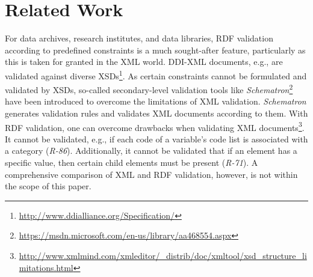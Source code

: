 \documentclass[conference]{IEEEtran}
\newcommand{\ke}[1]{\todo[size=\small, color=red!40]{\textbf{Kai:} #1}}
\newcommand{\tb}[1]{\todo[size=\small, color=green!40]{\textbf{Thomas:} #1}}
\begin{document}
 


\section{Related Work}
\label{related-work}

For data archives, research institutes, and data libraries,
RDF validation according to predefined constraints is a much sought-after feature, 
particularly as this is taken for granted in the XML world.
DDI-XML documents, e.g., are validated against diverse XSDs\footnote{\url{http://www.ddialliance.org/Specification/}}.
As certain constraints cannot be formulated and validated by XSDs, 
so-called secondary-level validation tools like \emph{Schematron}\footnote{\url{https://msdn.microsoft.com/en-us/library/aa468554.aspx}} have been introduced to overcome the limitations of XML validation.
\emph{Schematron} generates validation rules and validates XML documents according to them.
With RDF validation, one can overcome drawbacks when validating XML documents\footnote{\url{http://www.xmlmind.com/xmleditor/_distrib/doc/xmltool/xsd_structure_limitations.html}}.
It cannot be validated, e.g., if each code of a variable's code list is associated with a category (\emph{R-86}).
Additionally, it cannot be validated that if an element has a specific value, then certain child elements must be present (\emph{R-71}).  
A comprehensive comparison of XML and RDF validation, however, is not within the scope of this paper.
\end{document}
